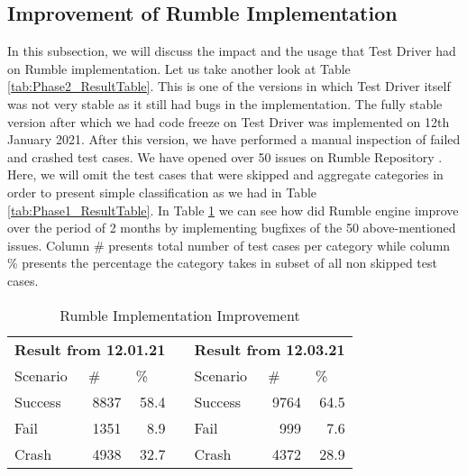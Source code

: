 \subsection{Improvement of Rumble Implementation}
In this subsection, we will discuss the impact and the usage that Test Driver had on Rumble implementation. Let us take another look at Table \ref{tab:Phase2_ResultTable}. This is one of the versions in which Test Driver itself was not very stable as it still had bugs in the implementation. The fully stable version after which we had code freeze on Test Driver was implemented on 12th January 2021. After this version, we have performed a manual inspection of failed and crashed test cases. We have opened over 50 issues on Rumble Repository \cite{IssuesSubmitted}. Here, we will omit the test cases that were skipped and aggregate categories in order to present simple classification as we had in Table \ref{tab:Phase1_ResultTable}. In Table \ref{tab:bugsimprovement} we can see how did Rumble engine improve over the period of 2 months by implementing bugfixes of the 50 above-mentioned issues. Column \# presents total number of test cases per category while column \% presents the percentage the category takes in subset of all non skipped test cases.
 
\begin{table}[h!]
	\vspace{-4mm}
	\centering
	\begin{tabular}{|l|r|r|r|l|r|r|}
		\cline{1-3} \cline{5-7}
		\multicolumn{3}{|c|}{\textbf{Result from 12.01.21}}          & \multicolumn{1}{l|}{}          & \multicolumn{3}{c|}{\textbf{Result from 12.03.21}}           \\ \cline{1-3} \cline{5-7} 
		Scenario & \multicolumn{1}{l|}{\#} & \multicolumn{1}{l|}{\%} & \multicolumn{1}{l|}{\textbf{}} & Scenario & \multicolumn{1}{l|}{\#} & \multicolumn{1}{l|}{\%} \\ \cline{1-3} \cline{5-7} 
		Success  & 8837                    & 58.4                    &                                & Success  & 9764                    & 64.5                    \\ \cline{1-3} \cline{5-7} 
		Fail     & 1351                    & 8.9                     &                                & Fail     & 999                     & 7.6                     \\ \cline{1-3} \cline{5-7} 
		Crash    & 4938                    & 32.7                    &                                & Crash    & 4372                    & 28.9                    \\ \cline{1-3} \cline{5-7} 
	\end{tabular}
	\caption{Rumble Implementation Improvement}
	\label{tab:bugsimprovement}
	\vspace{-5mm}
\end{table}

